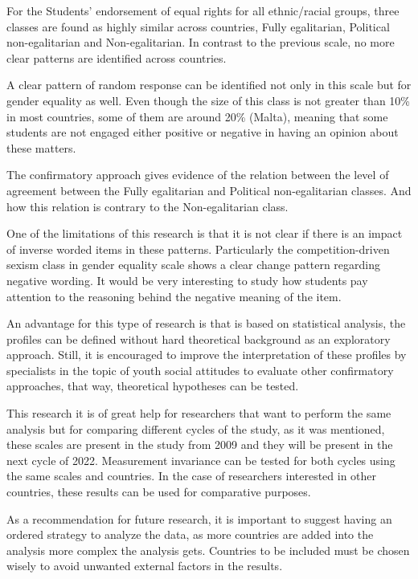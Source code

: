 \documentclass[12pt,a4paper,oneside]{reedthesis}
\begin{document}
For the Students' endorsement of equal rights for all ethnic/racial groups, three classes are found as highly similar across countries, Fully egalitarian, Political non-egalitarian and Non-egalitarian. In contrast to the previous scale, no more clear patterns are identified across countries.

A clear pattern of random response can be identified not only in this scale but for gender equality as well. Even though the size of this class is not greater than 10\% in most countries, some of them are around 20\% (Malta), meaning that some students are not engaged either positive or negative in having an opinion about these matters.

The confirmatory approach gives evidence of the relation between the level of agreement between the Fully egalitarian and Political non-egalitarian classes. And how this relation is contrary to the Non-egalitarian class.

One of the limitations of this research is that it is not clear if there is an impact of inverse worded items in these patterns. Particularly the competition-driven sexism class in gender equality scale shows a clear change pattern regarding negative wording. It would be very interesting to study how students pay attention to the reasoning behind the negative meaning of the item.

An advantage for this type of research is that is based on statistical analysis, the profiles can be defined without hard theoretical background as an exploratory approach. Still, it is encouraged to improve the interpretation of these profiles by specialists in the topic of youth social attitudes to evaluate other confirmatory approaches, that way, theoretical hypotheses can be tested.

This research it is of great help for researchers that want to perform the same analysis but for comparing different cycles of the study, as it was mentioned, these scales are present in the study from 2009 and they will be present in the next cycle of 2022. Measurement invariance can be tested for both cycles using the same scales and countries. In the case of researchers interested in other countries, these results can be used for comparative purposes.

As a recommendation for future research, it is important to suggest having an ordered strategy to analyze the data, as more countries are added into the analysis more complex the analysis gets. Countries to be included must be chosen wisely to avoid unwanted external factors in the results.
\end{document}
